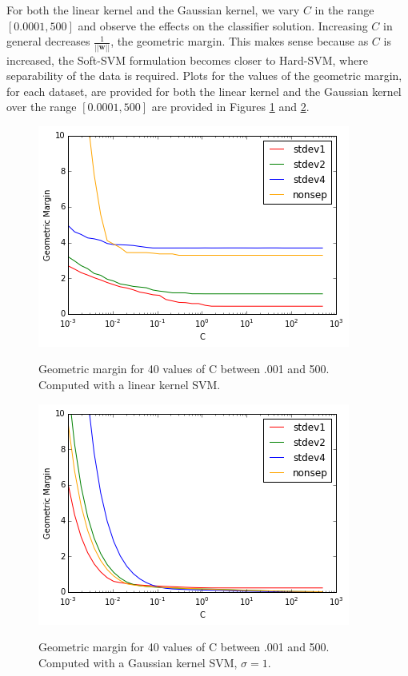 \documentclass[10pt]{article}
\begin{document}
For both the linear kernel and the Gaussian kernel, we vary $C$ in the range $[0.0001, 500]$ and observe the effects on the classifier solution.  Increasing $C$ in general decreases $\frac{1}{||\mathbf{w}||}$, the geometric margin.  This makes sense because as $C$ is increased, the Soft-SVM formulation becomes closer to Hard-SVM, where separability of the data is required.  Plots for the values of the geometric margin, for each dataset, are provided for both the linear kernel and the Gaussian kernel over the range $[0.0001, 500]$ are provided in Figures \ref{geom_lin} and \ref{geom_gauss}.
\begin{figure}
\centering
\includegraphics[scale=0.5]{geom_lin.png}
\label{geom_lin}
\caption{Geometric margin for 40 values of C between .001 and 500.  Computed with a linear kernel SVM.}
\end{figure}

\begin{figure}
\centering
\includegraphics[scale=0.5]{geom_gauss.png}
\label{geom_gauss}
\caption{Geometric margin for 40 values of C between .001 and 500.  Computed with a Gaussian kernel SVM, $\sigma=1$.}
\end{figure}
\end{document}
